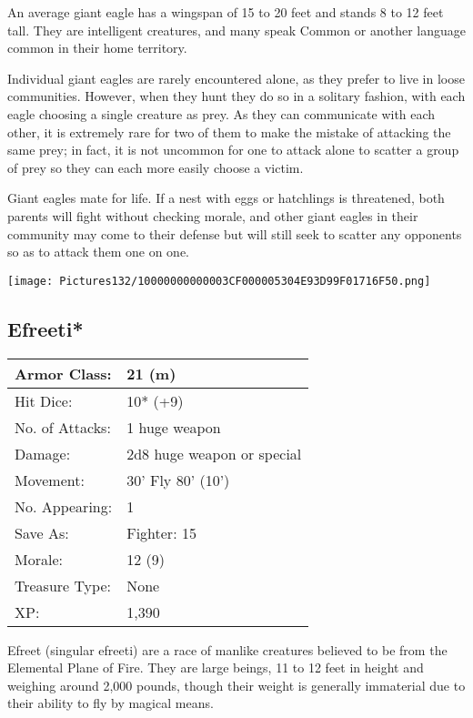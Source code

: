 \documentclass[a4paper,twoside,openany,10pt]{book}
\begin{document}
\begin{multicols}{2}
An average giant eagle has a wingspan of 15 to 20 feet and stands 8 to 12 feet tall. They are intelligent creatures, and many speak Common or another language common in their home territory.

Individual giant eagles are rarely encountered alone, as they prefer to live in loose communities. However, when they hunt they do so in a solitary fashion, with each eagle choosing a single creature as prey. As they can communicate with each other, it is extremely rare for two of them to make the mistake of attacking the same prey; in fact, it is not uncommon for one to attack alone to scatter a group of prey so they can each more easily choose a victim.

Giant eagles mate for life. If a nest with eggs or hatchlings is threatened, both parents will fight without checking morale, and other giant eagles in their community may come to their defense but will still seek to scatter any opponents so as to attack them one on one.

\begin{center}
	\texttt{[image: Pictures132/10000000000003CF000005304E93D99F01716F50.png]}
\end{center}

\subsection*{Efreeti*}\label{efreeti}

\begin{tabularx}{0.48\textwidth}{@{}lX@{}}
Armor Class: & 21 (m) \\\hline
Hit Dice: & 10* (+9) \\\hline
No. of Attacks: & 1 huge weapon \\\hline
Damage: & 2d8 huge weapon or special \\\hline
Movement: & 30' Fly 80'
(10') \\\hline
No. Appearing: & 1 \\\hline
Save As: & Fighter: 15 \\\hline
Morale: & 12 (9) \\\hline
Treasure Type: & None \\\hline
XP: & 1,390 \\\hline
\end{tabularx}\medskip

Efreet (singular efreeti) are a race of manlike creatures believed to be from the Elemental Plane of Fire. They are large beings, 11 to 12 feet in height and weighing around 2,000 pounds, though their weight is generally immaterial due to their ability to fly by magical means.


\end{multicols}
\end{document}
